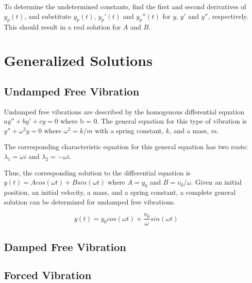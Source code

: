 \documentclass[11pt]{article} %
\begin{document}
\begin{multicols}{2}
\begin{flushleft}
To determine the undetermined constants, find  the first and second derivatives of $y_p(t)$, and substitute $y_p(t)$, $y_p'(t)$ and $y_p''(t)$ for $y$, $y'$ and $y''$, respectively. This should result in a real solution for $A$ and $B$.

\section {Generalized Solutions}
\subsection {Undamped Free Vibration}
Undamped free vibrations are described by the homogenous differential equation $ay'' + by' + cy = 0$ where b = 0. The general equation for this type of vibration is $y'' + \omega^2y = 0$ where $\omega^2 = k / m$ with a spring constant, $k$, and a mass, $m$.

The corresponding characteristic equation for this general equation has two roots: $\lambda_1 = {\omega}i$ and $\lambda_2 = -{\omega}i$.

Thus, the corresponding solution to the differential equation is $y(t) = Acos({\omega}t) + Bsin({\omega}t)$ where $A = y_0$ and $B = v_0 / \omega$. Given an initial position, an initial velocity, a mass, and a spring constant, a complete general solution can be determined for undamped free vibrations.

\begin{equation}
y(t) = {y_0}cos({\omega}t) +  \frac{v_0}{\omega}sin({\omega}t)
\end{equation}

\subsection {Damped Free Vibration}

\subsection {Forced Vibration}
\end{flushleft}
\end{multicols}
\end{document}
